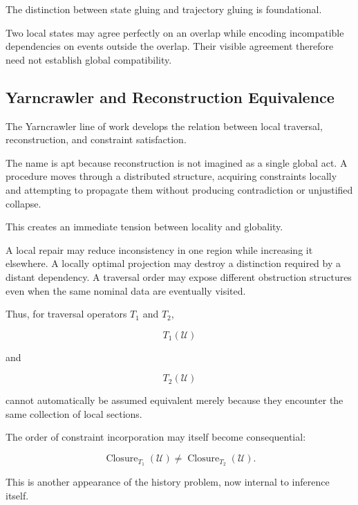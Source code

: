 \documentclass[11pt]{article}
\theoremstyle{remark}
\begin{document}
The distinction between state gluing and trajectory gluing is foundational.

Two local states may agree perfectly on an overlap while encoding incompatible dependencies on events outside the overlap. Their visible agreement therefore need not establish global compatibility.

\subsection{Yarncrawler and Reconstruction Equivalence}

The Yarncrawler line of work develops the relation between local traversal, reconstruction, and constraint satisfaction.

The name is apt because reconstruction is not imagined as a single global act. A procedure moves through a distributed structure, acquiring constraints locally and attempting to propagate them without producing contradiction or unjustified collapse.

This creates an immediate tension between locality and globality.

A local repair may reduce inconsistency in one region while increasing it elsewhere. A locally optimal projection may destroy a distinction required by a distant dependency. A traversal order may expose different obstruction structures even when the same nominal data are eventually visited.

Thus, for traversal operators $T_1$ and $T_2$,

\begin{equation}
T_1(\mathcal{U})
\end{equation}

and

\begin{equation}
T_2(\mathcal{U})
\end{equation}

cannot automatically be assumed equivalent merely because they encounter the same collection of local sections.

The order of constraint incorporation may itself become consequential:

\begin{equation}
\operatorname{Closure}_{T_1}(\mathcal{U})
\neq
\operatorname{Closure}_{T_2}(\mathcal{U}).
\end{equation}

This is another appearance of the history problem, now internal to inference itself.
\end{document}
